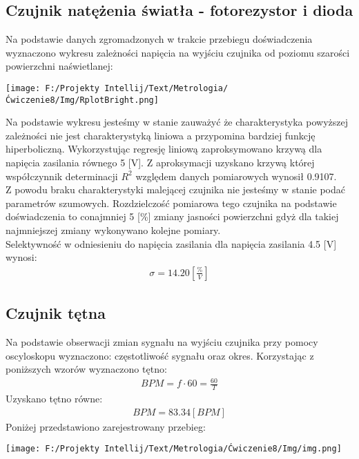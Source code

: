 \documentclass[11pt]{article}
\begin{document}
    \subsection*{Czujnik natężenia światła - fotorezystor i dioda}
    Na podstawie danych zgromadzonych w trakcie przebiegu doświadczenia wyznaczono wykresu zależności napięcia na wyjściu czujnika od poziomu szarości
    powierzchni naświetlanej:
    \begin{center}
        \texttt{[image: F:/Projekty Intellij/Text/Metrologia/Ćwiczenie8/Img/RplotBright.png]}
    \end{center}
    \par Na podstawie wykresu jesteśmy w stanie zauważyć że charakterystyka powyższej zależności nie jest charakterystyką liniowa a przypomina bardziej
    funkcję hiperboliczną. Wykorzystując regresję liniową zaproksymowano krzywą dla napięcia zasilania równego 5 [V]. Z aproksymacji uzyskano krzywą
    której współczynnik determinacji $R^2$ względem danych pomiarowych wynosił 0.9107. \\
    \indent Z powodu braku charakterystyki malejącej czujnika nie jesteśmy w stanie podać parametrów szumowych. Rozdzielczość pomiarowa tego czujnika
    na podstawie doświadczenia to conajmniej 5 [\%] zmiany jasności powierzchni gdyż dla takiej najmniejszej zmiany wykonywano kolejne pomiary.\\
    \indent Selektywność w odniesieniu do napięcia zasilania dla napięcia zasilania 4.5 [V] wynosi:
    \begin{gather*}
        \sigma=14.20[\frac{\%}{V}]
    \end{gather*}

    \subsection*{Czujnik tętna}
    Na podstawie obserwacji zmian sygnału na wyjściu czujnika przy pomocy oscyloskopu wyznaczono: częstotliwość sygnału oraz okres.
    Korzystając z poniższych wzorów wyznaczono tętno:
    \begin{gather*}
        BPM=f\cdot 60=\frac{60}{T}
    \end{gather*}
    Uzyskano tętno równe:
    \begin{gather*}
        BPM=83.34 [BPM]
    \end{gather*}
    Poniżej przedstawiono zarejestrowany przebieg:
    \begin{center}
        \texttt{[image: F:/Projekty Intellij/Text/Metrologia/Ćwiczenie8/Img/img.png]}
    \end{center}
\end{document}
